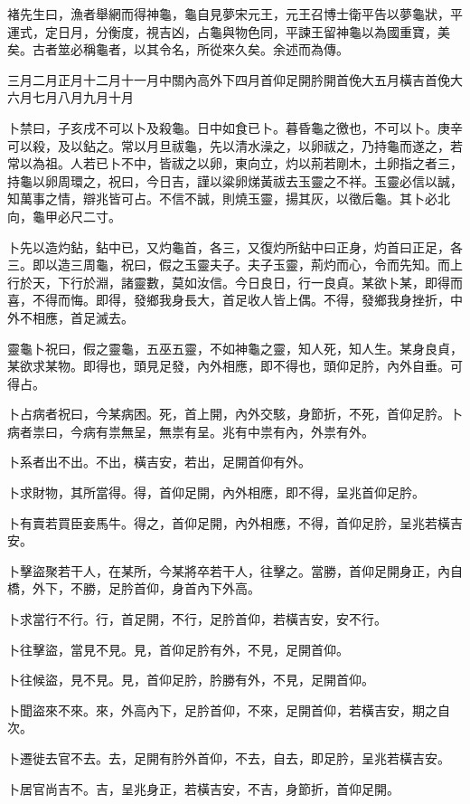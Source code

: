 褚先生曰，漁者舉網而得神龜，龜自見夢宋元王，元王召博士衛平告以夢龜狀，平運式，定日月，分衡度，視吉凶，占龜與物色同，平諫王留神龜以為國重寶，美矣。古者筮必稱龜者，以其令名，所從來久矣。余述而為傳。

三月二月正月十二月十一月中關內高外下四月首仰足開肣開首俛大五月橫吉首俛大六月七月八月九月十月

卜禁曰，子亥戌不可以卜及殺龜。日中如食已卜。暮昏龜之徼也，不可以卜。庚辛可以殺，及以鉆之。常以月旦祓龜，先以清水澡之，以卵祓之，乃持龜而遂之，若常以為祖。人若已卜不中，皆祓之以卵，東向立，灼以荊若剛木，土卵指之者三，持龜以卵周環之，祝曰，今日吉，謹以粱卵焍黃祓去玉靈之不祥。玉靈必信以誠，知萬事之情，辯兆皆可占。不信不誠，則燒玉靈，揚其灰，以徵后龜。其卜必北向，龜甲必尺二寸。

卜先以造灼鉆，鉆中已，又灼龜首，各三，又復灼所鉆中曰正身，灼首曰正足，各三。即以造三周龜，祝曰，假之玉靈夫子。夫子玉靈，荊灼而心，令而先知。而上行於天，下行於淵，諸靈數，莫如汝信。今日良日，行一良貞。某欲卜某，即得而喜，不得而悔。即得，發鄉我身長大，首足收人皆上偶。不得，發鄉我身挫折，中外不相應，首足滅去。

靈龜卜祝曰，假之靈龜，五巫五靈，不如神龜之靈，知人死，知人生。某身良貞，某欲求某物。即得也，頭見足發，內外相應，即不得也，頭仰足肣，內外自垂。可得占。

卜占病者祝曰，今某病困。死，首上開，內外交駭，身節折，不死，首仰足肣。卜病者祟曰，今病有祟無呈，無祟有呈。兆有中祟有內，外祟有外。

卜系者出不出。不出，橫吉安，若出，足開首仰有外。

卜求財物，其所當得。得，首仰足開，內外相應，即不得，呈兆首仰足肣。

卜有賣若買臣妾馬牛。得之，首仰足開，內外相應，不得，首仰足肣，呈兆若橫吉安。

卜擊盜聚若干人，在某所，今某將卒若干人，往擊之。當勝，首仰足開身正，內自橋，外下，不勝，足肣首仰，身首內下外高。

卜求當行不行。行，首足開，不行，足肣首仰，若橫吉安，安不行。

卜往擊盜，當見不見。見，首仰足肣有外，不見，足開首仰。

卜往候盜，見不見。見，首仰足肣，肣勝有外，不見，足開首仰。

卜聞盜來不來。來，外高內下，足肣首仰，不來，足開首仰，若橫吉安，期之自次。

卜遷徙去官不去。去，足開有肣外首仰，不去，自去，即足肣，呈兆若橫吉安。

卜居官尚吉不。吉，呈兆身正，若橫吉安，不吉，身節折，首仰足開。

